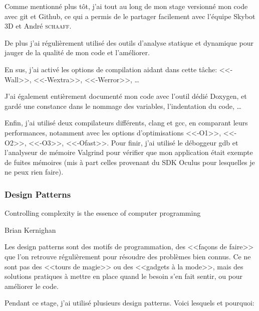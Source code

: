 \documentclass[a4paper,french,12pt]{article}
\begin{document}
	    Comme mentionné plus tôt, j'ai tout au long de mon stage versionné mon code avec git et Github, ce qui a
	    permis de le partager facilement avec l'équipe Skybot 3D et André \textsc{schaaff}.

	    De plus j'ai régulièrement utilisé des outils d'analyse statique et dynamique pour jauger de la qualité de
	    mon code et l'améliorer.

	    En sus, j'ai activé les options de compilation aidant dans cette tâche: <<-Wall>>, <<-Wextra>>, <<-Werror>>, \ldots



	    J'ai également entièrement documenté mon code avec l'outil dédié Doxygen, et gardé une constance dans le nommage des variables,
	    l'indentation du code, \ldots

	    Enfin, j'ai utilisé deux compilateurs différents, clang et gcc, en comparant leurs performances,
	    notamment avec les options d'optimisations <<-O1>>, <<-O2>>, <<-O3>>, <<-Ofast>>.
	    Pour finir, j'ai utilisé le déboggeur gdb et l'analyseur de mémoire Valgrind pour vérifier que mon application
	    était exempte de fuites mémoires (mis à part celles provenant du SDK Oculus pour lesquelles je ne peux rien faire).


	  \subsubsection{Design Patterns}
	      \epigraph{Controlling complexity is the essence of computer programming}{Brian Kernighan}



	    Les design patterns sont des motifs de programmation, des <<façons de faire>> que l'on retrouve régulièrement
	    pour résoudre des problèmes bien connus. Ce ne sont pas des <<tours de magie>> ou des  <<gadgets à la mode>>,
	    mais des solutions pratiques à mettre en place quand le besoin s'en fait sentir, ou pour améliorer le code.

	    Pendant ce stage, j'ai utilisé plusieurs design patterns. Voici lesquels et pourquoi:
\end{document}
